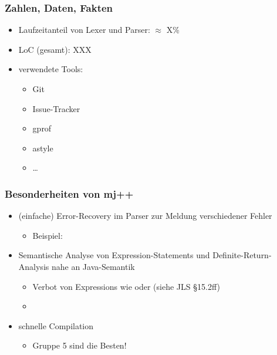 \begin{frame}
	\frametitle{Zahlen, Daten, Fakten} %
	\begin{itemize}
		\item Laufzeitanteil von Lexer und Parser: $\approx$ X\%	%
		\item LoC (gesamt): XXX
		\item verwendete Tools: 
		\begin{itemize}
			\item Git
			\item Issue-Tracker
			\item gprof
			\item astyle
			\item \dots
		\end{itemize}
	\end{itemize}
\end{frame}

\begin{frame}
    \frametitle{Besonderheiten von mj++}
    \begin{itemize}
        \item (einfache) Error-Recovery im Parser zur Meldung verschiedener Fehler
        \begin{itemize}
        	\item Beispiel: \code{public static 12 [ void main...}
        \end{itemize} \pause
        \item Semantische Analyse von Expression-Statements und Definite-Return-Analysis nahe an Java-Semantik
        \begin{itemize}
        	\item Verbot von Expressions wie  oder  (siehe JLS §15.2ff)
        	\item[] 
        \end{itemize} \pause
        \item schnelle Compilation
            \pause
        \begin{itemize}
        \item Gruppe 5 sind die Besten!
        \end{itemize}
    \end{itemize}
\end{frame}